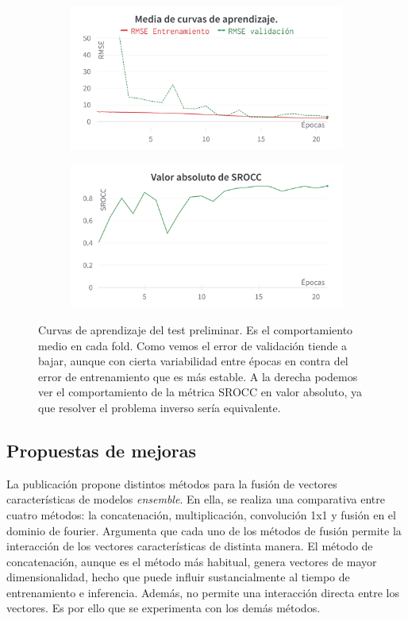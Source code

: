\begin{figure}[htp]
  \begin{subfigure}[b]{0.49\textwidth}
  \centering
    \includegraphics[width=\textwidth]{imagenes/chapter5/PreTestCurves.png}
  \end{subfigure}
  \begin{subfigure}[b]{0.49\textwidth}
  \centering
    \includegraphics[width=\textwidth]{imagenes/chapter5/PreTestSROCC.png}
  \end{subfigure}
  \caption[Curvas de aprendizaje del test preliminar.]{Curvas de aprendizaje del test preliminar. Es el comportamiento medio en cada fold.
  Como vemos el error de validación tiende a bajar, aunque con cierta variabilidad 
  entre épocas en contra del error de entrenamiento que es más estable. A la derecha 
  podemos ver el comportamiento de la métrica SROCC en valor absoluto, ya 
  que resolver el problema inverso sería equivalente.}
  \label{fig:PreTestCurves}
\end{figure}


\subsection{Propuestas de mejoras}
La publicación \cite{EnsemblePCQA} propone distintos métodos para la fusión de vectores características de modelos \emph{ensemble}.
En ella, se realiza una comparativa entre cuatro métodos: la concatenación, multiplicación, convolución 1x1 y 
fusión en el dominio de fourier. 
Argumenta que cada uno de los métodos de fusión permite la interacción de los vectores 
características de distinta manera. El método de concatenación, aunque es el método 
más habitual, genera vectores de mayor dimensionalidad, hecho que puede influir 
sustancialmente al tiempo de entrenamiento e inferencia. Además, no permite una interacción directa entre los vectores. 
Es por ello que se experimenta con los demás métodos.  

